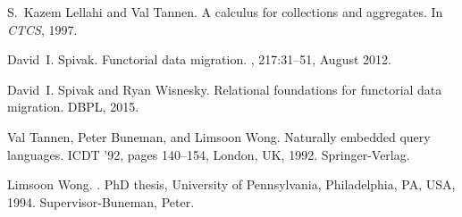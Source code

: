 \documentclass[11pt]{article}
\theoremstyle{remark}
\theoremstyle{definition}
\begin{document}

\begin{thebibliography}{1}

S.~Kazem Lellahi and Val Tannen.
\newblock A calculus for collections and aggregates.
\newblock In {\em CTCS}, 1997.

David~I. Spivak.
\newblock Functorial data migration.
, 217:31--51, August 2012.

David~I. Spivak and Ryan Wisnesky.
\newblock Relational foundations for functorial data migration.
\newblock DBPL, 2015.

Val Tannen, Peter Buneman, and Limsoon Wong.
\newblock Naturally embedded query languages.
\newblock ICDT '92, pages 140--154, London, UK, 1992. Springer-Verlag.

Limsoon Wong.
.
\newblock PhD thesis, University of Pennsylvania, Philadelphia, PA, USA, 1994.
\newblock Supervisor-Buneman, Peter.

\end{thebibliography}
\end{document}
